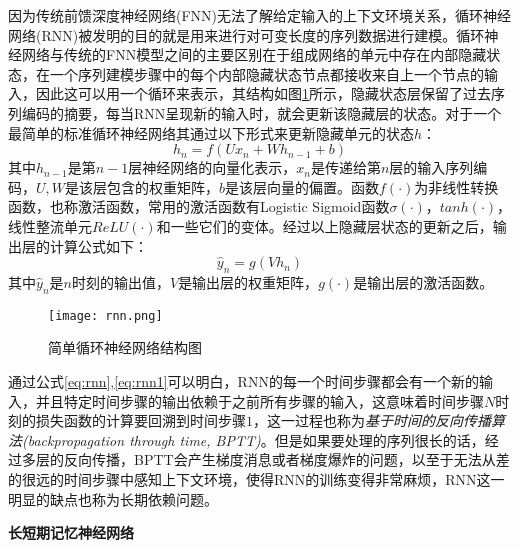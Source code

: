 因为传统前馈深度神经网络(FNN)无法了解给定输入的上下文环境关系，循环神经网络(RNN)\cite{RNN1994}被发明的目的就是用来进行对可变长度的序列数据进行建模。循环神经网络与传统的FNN模型之间的主要区别在于组成网络的单元中存在内部隐藏状态，在一个序列建模步骤中的每个内部隐藏状态节点都接收来自上一个节点的输入，因此这可以用一个循环来表示，其结构如图\ref{fig:rnn}所示，隐藏状态层保留了过去序列编码的摘要，每当RNN呈现新的输入时，就会更新该隐藏层的状态。对于一个最简单的标准循环神经网络其通过以下形式来更新隐藏单元的状态$h$：
\begin{equation}
  \label{eq:rnn}
  h_{n} = f \left(Ux_{n} + Wh_{n-1} + b \right)
\end{equation}
其中$h_{n-1}$是第$n-1$层神经网络的向量化表示，$x_{n}$是传递给第$n$层的输入序列编码，$U,W$是该层包含的权重矩阵，$b$是该层向量的偏置。函数$f(\cdot)$为非线性转换函数，也称激活函数，常用的激活函数有Logistic Sigmoid函数$\sigma(\cdot )$，$tanh(\cdot)$，线性整流单元$ReLU(\cdot)$和一些它们的变体。经过以上隐藏层状态的更新之后，输出层的计算公式如下：
\begin{equation}
  \label{eq:rnn1}
  \hat{y}_{n} = g(Vh_{n})
\end{equation}
其中$\hat{y}_{n}$是$n$时刻的输出值，$V$是输出层的权重矩阵，$g(\cdot)$是输出层的激活函数。

\begin{figure}[htb]%
  \centering
  \texttt{[image: rnn.png]}\\
  \caption{简单循环神经网络结构图}
  \label{fig:rnn}
\end{figure}

通过公式\ref{eq:rnn},\ref{eq:rnn1}可以明白，RNN的每一个时间步骤都会有一个新的输入，并且特定时间步骤的输出依赖于之前所有步骤的输入，这意味着时间步骤$N$时刻的损失函数的计算要回溯到时间步骤$1$，这一过程也称为\textit{基于时间的反向传播算法(backpropagation through time, BPTT)}。但是如果要处理的序列很长的话，经过多层的反向传播，BPTT会产生梯度消息或者梯度爆炸的问题，以至于无法从差的很远的时间步骤中感知上下文环境，使得RNN的训练变得非常麻烦，RNN这一明显的缺点也称为长期依赖问题。

\textbf{长短期记忆神经网络}

